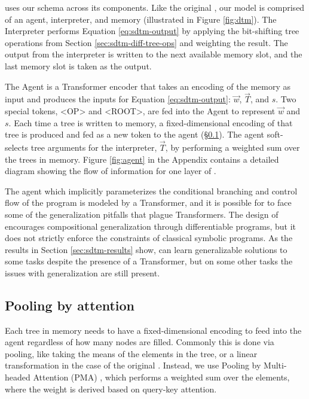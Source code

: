 \sdtm uses our \fullrepname schema across its components. Like the original \dtm, our model is comprised of an agent, interpreter, and memory (illustrated in Figure \ref{fig:dtm}). The Interpreter performs Equation \ref{eq:sdtm-output} by applying the bit-shifting tree operations from Section \ref{sec:sdtm-diff-tree-ops} and weighting the result. The output from the interpreter is written to the next available memory slot, and the last memory slot is taken as the output.

The Agent is a Transformer encoder that takes an encoding of the memory as input and produces the inputs for Equation \ref{eq:sdtm-output}: $\vec{w}$, $\vec{T}$, and $s$. Two special tokens, <OP> and <ROOT>, are fed into the Agent to represent $\vec{w}$ and $s$. Each time a tree is written to memory, a fixed-dimensional encoding of that tree is produced and fed as a new token to the agent (\S \ref{sec:sdtm-mha}). The agent soft-selects tree arguments for the interpreter, $\vec{T}$, by performing a weighted sum over the trees in memory. Figure \ref{fig:agent} in the Appendix contains a detailed diagram showing the flow of information for one layer of \sdtm.

The agent which implicitly parameterizes the conditional branching and control flow of the program is modeled by a Transformer, and it is possible for \sdtm to face some of the generalization pitfalls that plague Transformers. The design of \sdtm encourages compositional generalization through differentiable programs, but it does not strictly enforce the constraints of classical symbolic programs. As the results in Section \ref{sec:sdtm-results} show, \sdtm can learn generalizable solutions to some tasks despite the presence of a Transformer, but on some other tasks the issues with generalization are still present. 

\subsection{Pooling by attention} \label{sec:sdtm-mha}

Each tree in memory needs to have a fixed-dimensional encoding to feed into the agent regardless of how many nodes are filled. Commonly this is done via pooling, like taking the means of the elements in the tree, or a linear transformation in the case of the original \dtm. Instead, we use Pooling by Multi-headed Attention (PMA) \citep{pmlr-v97-lee19d}, which performs a weighted sum over the elements, where the weight is derived based on query-key attention.

